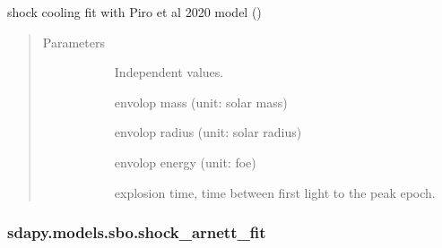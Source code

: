 \documentclass[letterpaper,10pt,english]{sphinxmanual}
\begin{document}
\begin{fulllineitems}
\label{\detokenize{generated/sdapy.models.sbo.shock_fit:sdapy.models.sbo.shock_fit}}
shock cooling fit with Piro et al 2020 model ()
\begin{quote}\begin{description}
\item[{Parameters}] \leavevmode\begin{description}
\item[{}] \leavevmode{[}\sphinxtitleref{array}{]}
Independent values.

\item[{}] \leavevmode{[}\sphinxtitleref{float}{]}
envolop mass (unit: solar mass)

\item[{}] \leavevmode{[}\sphinxtitleref{float}{]}
envolop radius (unit: solar radius)

\item[{}] \leavevmode{[}\sphinxtitleref{float}{]}
envolop energy (unit: foe)

\item[{}] \leavevmode{[}\sphinxtitleref{float}{]}
explosion time, time between first light to the peak epoch.

\end{description}

\end{description}\end{quote}

\end{fulllineitems}



\subsubsection{sdapy.models.sbo.shock\_arnett\_fit}
\label{\detokenize{generated/sdapy.models.sbo.shock_arnett_fit:sdapy-models-sbo-shock-arnett-fit}}\label{\detokenize{generated/sdapy.models.sbo.shock_arnett_fit::doc}}
\end{document}

